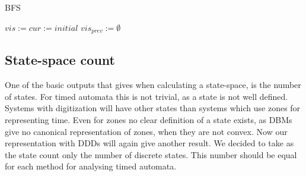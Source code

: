 \begin{algorithm}
\caption{BFS}\label{alg:bfs-no-minus}
\begin{algorithmic}[1]
	\State $vis := cur := initial$
	\State $vis_{prev} := \emptyset$
	\EndWhile
	
\EndProcedure	
\end{algorithmic}
\end{algorithm}

\subsection{State-space count}
One of the basic outputs that \ltsmin{} gives when calculating a state-space, is the number of states. For timed automata this is not trivial, as a state is not well defined. Systems with digitization will have other states than systems which use zones for representing time. Even for zones no clear definition of a state exists, as DBMs give no canonical representation of zones, when they are not convex. Now our representation with DDDs will again give another result. We decided to take as the state count only the number of discrete states. This number should be equal for each method for analysing timed automata.